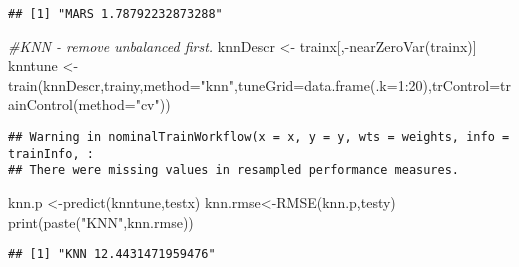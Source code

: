 \documentclass[
]{article}
\newenvironment{Shaded}{\begin{snugshade}}{\end{snugshade}}
\newcommand{\AttributeTok}[1]{\textcolor[rgb]{0.77,0.63,0.00}{#1}}
\newcommand{\CommentTok}[1]{\textcolor[rgb]{0.56,0.35,0.01}{\textit{#1}}}
\newcommand{\DecValTok}[1]{\textcolor[rgb]{0.00,0.00,0.81}{#1}}
\newcommand{\FunctionTok}[1]{\textcolor[rgb]{0.00,0.00,0.00}{#1}}
\newcommand{\NormalTok}[1]{#1}
\newcommand{\OtherTok}[1]{\textcolor[rgb]{0.56,0.35,0.01}{#1}}
\newcommand{\SpecialCharTok}[1]{\textcolor[rgb]{0.00,0.00,0.00}{#1}}
\newcommand{\StringTok}[1]{\textcolor[rgb]{0.31,0.60,0.02}{#1}}
\begin{document}
\begin{verbatim}
## [1] "MARS 1.78792232873288"
\end{verbatim}

\begin{Shaded}
\begin{Highlighting}[]
\CommentTok{\#KNN {-} remove unbalanced first.}
\NormalTok{knnDescr }\OtherTok{\textless{}{-}}\NormalTok{ trainx[,}\SpecialCharTok{{-}}\FunctionTok{nearZeroVar}\NormalTok{(trainx)]}
\NormalTok{knntune  }\OtherTok{\textless{}{-}} \FunctionTok{train}\NormalTok{(knnDescr,trainy,}\AttributeTok{method=}\StringTok{"knn"}\NormalTok{,}\AttributeTok{tuneGrid=}\FunctionTok{data.frame}\NormalTok{(}\AttributeTok{.k=}\DecValTok{1}\SpecialCharTok{:}\DecValTok{20}\NormalTok{),}\AttributeTok{trControl=}\FunctionTok{trainControl}\NormalTok{(}\AttributeTok{method=}\StringTok{"cv"}\NormalTok{))}
\end{Highlighting}
\end{Shaded}

\begin{verbatim}
## Warning in nominalTrainWorkflow(x = x, y = y, wts = weights, info = trainInfo, :
## There were missing values in resampled performance measures.
\end{verbatim}

\begin{Shaded}
\begin{Highlighting}[]
\NormalTok{knn.p }\OtherTok{\textless{}{-}}\FunctionTok{predict}\NormalTok{(knntune,testx)}
\NormalTok{knn.rmse}\OtherTok{\textless{}{-}}\FunctionTok{RMSE}\NormalTok{(knn.p,testy)}
\FunctionTok{print}\NormalTok{(}\FunctionTok{paste}\NormalTok{(}\StringTok{"KNN"}\NormalTok{,knn.rmse))}
\end{Highlighting}
\end{Shaded}

\begin{verbatim}
## [1] "KNN 12.4431471959476"
\end{verbatim}
\end{document}
